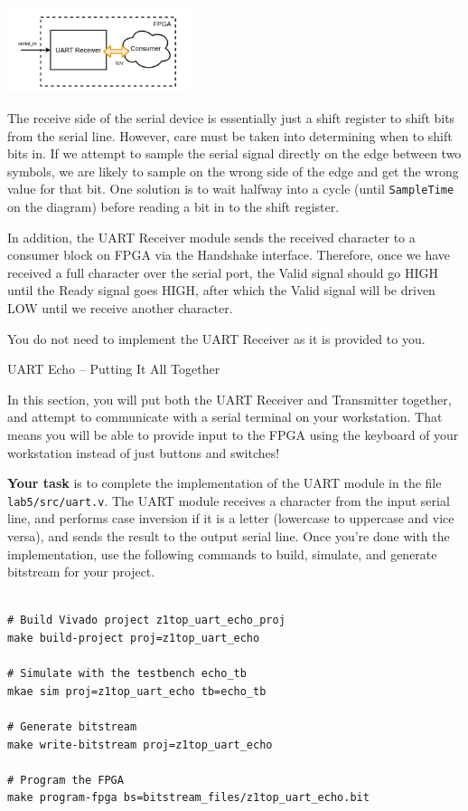 \documentclass[11pt]{article}
\makeatletter
\renewcommand{\subsection}
{\@startsection {subsection}{1}{0pt}
 {-1ex}
 {0.5ex}
 {\bfseries\normalsize}}
\makeatother
\begin{document}
\begin{center}
\includegraphics[width=0.4\textwidth]{figs/uart_rx.png}
\end{center}

The receive side of the serial device is essentially just a shift register to shift bits from the serial line.
However, care must be taken into determining when to shift bits in.
If we attempt to sample the serial signal directly on the edge between two symbols, we are likely to sample on the wrong side of the edge and get the wrong value for that bit.
One solution is to wait halfway into a cycle (until \verb|SampleTime| on the diagram) before reading a bit in to the shift register.

In addition, the UART Receiver module sends the received character to a consumer block on FPGA via the Handshake interface. Therefore, once we have received a full character over the serial port, the Valid signal should go HIGH until the Ready signal goes HIGH, after which the Valid signal will be driven LOW until we receive another character.

You do not need to implement the UART Receiver as it is provided to you.

\subsection{UART Echo -- Putting It All Together}

In this section, you will put both the UART Receiver and Transmitter together, and attempt to communicate with a serial terminal on your workstation. That means you will be able to provide input to the FPGA using the keyboard of your workstation instead of just buttons and switches!

\textbf{Your task} is to complete the implementation of the UART module in the file \verb|lab5/src/uart.v|. The UART module receives a character from the input serial line, and performs case inversion if it is a letter (lowercase to uppercase and vice versa), and sends the result to the output serial line. Once you're done with the implementation, use the following commands to build, simulate, and generate bitstream for your project.

\begin{verbatim}

# Build Vivado project z1top_uart_echo_proj
make build-project proj=z1top_uart_echo

# Simulate with the testbench echo_tb
mkae sim proj=z1top_uart_echo tb=echo_tb

# Generate bitstream
make write-bitstream proj=z1top_uart_echo

# Program the FPGA
make program-fpga bs=bitstream_files/z1top_uart_echo.bit
\end{verbatim}
\end{document}
